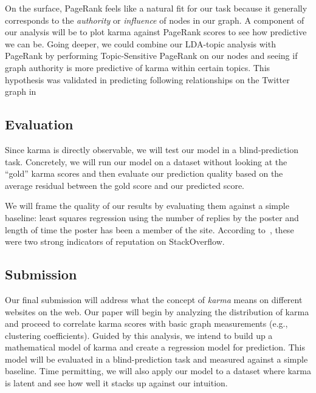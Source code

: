 \documentclass[10pt]{article}
\begin{document}
On the surface, PageRank feels like a natural fit for our task because it
generally corresponds to the \textit{authority} or \textit{influence} of nodes
in our graph. A component of our analysis will be to plot karma against PageRank
scores to see how predictive we can be.  Going deeper, we could combine our
LDA-topic analysis with PageRank by performing Topic-Sensitive PageRank
\citep{haveliwala2002topic} on our nodes and seeing if graph authority is more
predictive of karma within certain topics. This hypothesis was validated in
predicting following relationships on the Twitter graph in
\citet{weng2010twitterrank}

\subsection{Evaluation}
Since karma is directly observable, we will test our model in a
blind-prediction task. Concretely, we will run our model on a dataset without
looking at the ``gold'' karma scores and then evaluate our prediction quality
based on the average residual between the gold score and our predicted score.

We will frame the quality of our results by evaluating them against a simple
baseline: least squares regression using the number of replies by the poster and
length of time the poster has been a member of the site. According
to~\citet{movshovitzanalysis}, these were two strong indicators of reputation on
StackOverflow. 

\subsection{Submission}

Our final submission will address what the concept of \textit{karma} means on
different websites on the web. Our paper will begin by analyzing the
distribution of karma and proceed to correlate karma scores with basic graph
measurements (e.g., clustering coefficients). Guided by this analysis, we intend
to build up a mathematical model of karma and create a regression model for
prediction. This model will be evaluated in a blind-prediction task and measured
against a simple baseline. Time permitting, we will also apply our
model to a dataset where karma is latent and see how well it stacks up
against our intuition.



\end{document}
